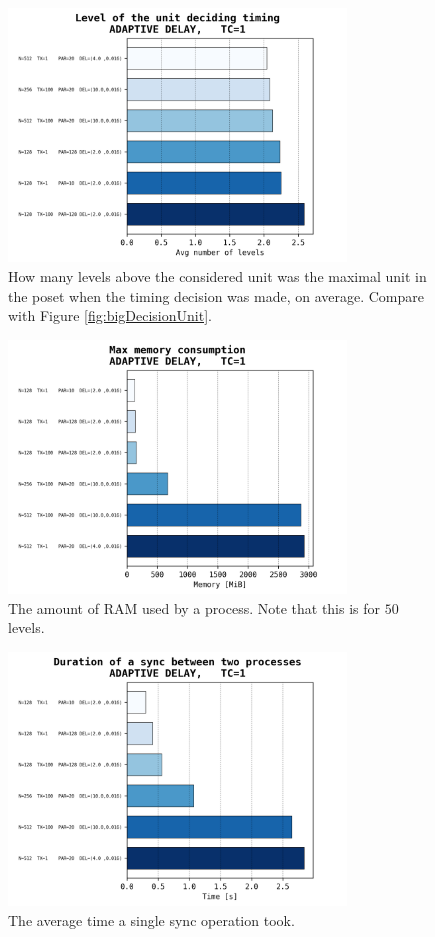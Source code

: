 \documentclass[a4paper,10pt]{article}
\begin{document}
			\begin{figure}[h]
				\centering
				\includegraphics[width=0.8\textwidth]{bar_plots/big/decision_height.png}
				\caption{How many levels above the considered unit was the maximal unit in the poset when the timing decision was made, on average. Compare with Figure \ref{fig:bigDecisionUnit}.}
				\label{fig:bigDecisionPoset}
			\end{figure}
			\begin{figure}[h]
				\centering
				\includegraphics[width=0.8\textwidth]{bar_plots/big/memory_MiB.png}
				\caption{The amount of RAM used by a process. Note that this is for $50$ levels.}
				\label{fig:bigRAM}
			\end{figure}
			\begin{figure}[h]
				\centering
				\includegraphics[width=0.8\textwidth]{bar_plots/big/time_per_sync.png}
				\caption{The average time a single sync operation took.}
				\label{fig:bigTimePerSync}
			\end{figure}
\end{document}
